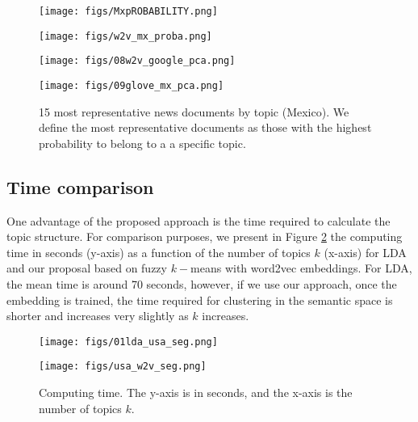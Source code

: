 \documentclass{article}
\begin{document}
\begin{figure}[H] 
  \begin{minipage}[b]{0.5\linewidth}
    \centering
  \centering
  \texttt{[image: figs/MxpROBABILITY.png]}
  \centering \vspace{1ex}
  \end{minipage}
  \begin{minipage}[b]{0.5\linewidth}
    \centering
  \centering
  \texttt{[image: figs/w2v\_mx\_proba.png]}
  \centering \vspace{1ex}
  \end{minipage}
    \begin{minipage}[b]{0.5\linewidth}
    \centering
  \centering
  \texttt{[image: figs/08w2v\_google\_pca.png]}
    \vspace{1ex}
  \end{minipage}
    \begin{minipage}[b]{0.5\linewidth}
    \centering
  \centering
  \texttt{[image: figs/09glove\_mx\_pca.png]}
    \vspace{1ex}
  \end{minipage}
    \caption{15 most representative news documents by topic (Mexico). We define the most representative documents as those with the highest probability to belong to a a specific topic.}

    \label{fig:chap3.fig18}
\end{figure}


\subsection{Time comparison}
\label{sec:computing-time}
One advantage of the proposed approach is the time required to calculate the topic structure. For comparison purposes, we present in Figure \ref{fig:chap3.4} the computing time in seconds (y-axis) as a function of the number of topics $k$ (x-axis) for LDA and our proposal based on fuzzy $k-$means with word2vec embeddings. For LDA, the mean time is around 70 seconds, however, if we use our approach, once the embedding is trained, the time required for clustering in the semantic space is shorter and increases very slightly as $k$ increases. 

\begin{figure}[H] 
  \begin{minipage}[b]{0.5\linewidth}
    \centering
  \centering
  \texttt{[image: figs/01lda\_usa\_seg.png]}
    \vspace{1ex}
  \end{minipage}
    \begin{minipage}[b]{0.5\linewidth}
    \centering
  \centering
  \texttt{[image: figs/usa\_w2v\_seg.png]}
    \vspace{1ex}
  \end{minipage}
  \caption{Computing time. The y-axis is in seconds, and the x-axis is the number of topics $k$.}
      \label{fig:chap3.4}
\end{figure}
\end{document}
